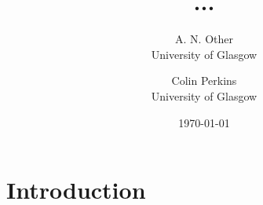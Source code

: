 \documentclass[twocolumn,a4paper]{article}
\begin{document}
\title{...}

\author{
  A. N. Other\\University of Glasgow
\and 
  Colin Perkins\\University of Glasgow
}

\date{\today}
\maketitle
\begin{abstract}




\end{abstract}
\section{Introduction}

%
\end{document}
